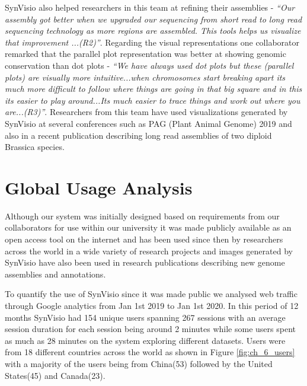SynVisio also helped researchers in this team at refining their assemblies - \textit{``Our assembly got better when we upgraded our sequencing from short read to long read sequencing technology as more regions are assembled. This tools helps us visualize that improvement ...(R2)''}. Regarding the visual representations one collaborator remarked that the parallel plot representation was better at showing genomic conservation than dot plots - \textit{``We have always used dot plots but these (parallel plots) are visually more intuitive...when chromosomes start breaking apart its much more difficult to follow where things are going in that big square and in this its easier to play around...Its much easier to trace things and work out where you are...(R3)''}. Researchers from this team have used visualizations generated by SynVisio at several conferences such as PAG (Plant Animal Genome) 2019 \cite{brassicapag} and also in a recent publication describing long read assemblies of two diploid Brassica species\cite{perumal2020high}.
 
\section{Global Usage Analysis}

Although our system was initially designed based on requirements from our collaborators for use within our university it was made publicly available as an open access tool on the internet and has been used since then by researchers across the world in a wide variety of research projects and images generated by SynVisio have also been used in research publications describing new genome assemblies and annotations\cite{mathers2020improved,perumal2020high}.

To quantify the use of SynVisio since it was made public we analysed web traffic through Google analytics  from Jan 1st 2019 to Jan 1st 2020. In this period of 12 months SynVisio had 154 unique users spanning 267 sessions with an average session duration for each session being around 2 minutes while some users spent as much as 28 minutes on the system exploring different datasets. Users were from 18 different countries across the world as shown in Figure \ref{fig:ch_6_users} with a majority of the users being from China(53) followed by the United States(45) and Canada(23).

